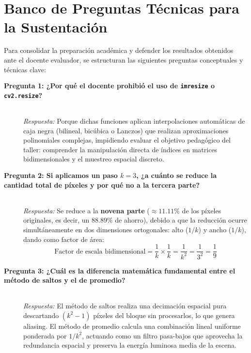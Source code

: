 \documentclass{article}
\begin{document}

\section{Banco de Preguntas Técnicas para la Sustentación}

Para consolidar la preparación académica y defender los resultados obtenidos ante el docente evaluador, se estructuran las siguientes preguntas conceptuales y técnicas clave:

\begin{description}
    \item[\textbf{Pregunta 1: ¿Por qué el docente prohibió el uso de \texttt{imresize} o \texttt{cv2.resize}?}]~\\
    \textit{Respuesta:} Porque dichas funciones aplican interpolaciones automáticas de caja negra (bilineal, bicúbica o Lanczos) que realizan aproximaciones polinomiales complejas, impidiendo evaluar el objetivo pedagógico del taller: comprender la manipulación directa de índices en matrices bidimensionales y el muestreo espacial discreto.
    
    \item[\textbf{Pregunta 2: Si aplicamos un paso $k = 3$, ¿a cuánto se reduce la cantidad total de píxeles y por qué no a la tercera parte?}]~\\
    \textit{Respuesta:} Se reduce a la \textbf{novena parte} ($\approx 11.11\%$ de los píxeles originales, es decir, un $88.89\%$ de ahorro), debido a que la reducción ocurre simultáneamente en dos dimensiones ortogonales: alto ($1/k$) y ancho ($1/k$), dando como factor de área:
    \begin{equation}
        \text{Factor de escala bidimensional} = \frac{1}{k} \times \frac{1}{k} = \frac{1}{k^2} = \frac{1}{3^2} = \frac{1}{9}
    \end{equation}

    \item[\textbf{Pregunta 3: ¿Cuál es la diferencia matemática fundamental entre el método de saltos y el de promedio?}]~\\
    \textit{Respuesta:} El método de saltos realiza una decimación espacial pura descartando $(k^2 - 1)$ píxeles del bloque sin procesarlos, lo que genera aliasing. El método de promedio calcula una combinación lineal uniforme ponderada por $1/k^2$, actuando como un filtro pasa-bajos que aprovecha la redundancia espacial y preserva la energía luminosa media de la escena.


\end{description}
\end{document}
